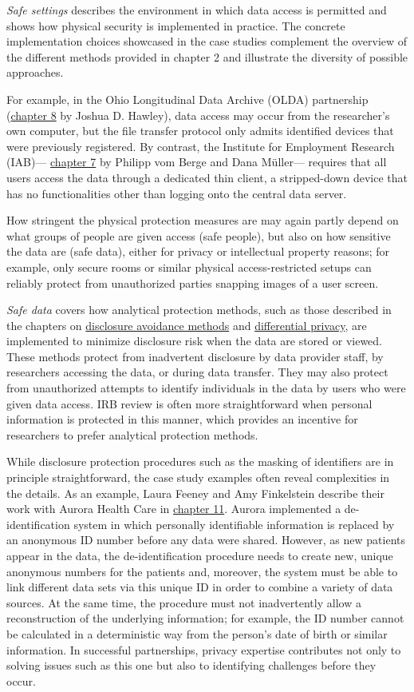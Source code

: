 \documentclass[
]{book}
\begin{document}
\emph{Safe settings} describes the environment in which data access is permitted and shows how physical security is implemented in practice. The concrete implementation choices showcased in the case studies complement the overview of the different methods provided in chapter 2 and illustrate the diversity of possible approaches.

For example, in the Ohio Longitudinal Data Archive (OLDA) partnership (\protect\hyperlink{olda}{chapter 8} by Joshua D. Hawley), data access may occur from the researcher's own computer, but the file transfer protocol only admits identified devices that were previously registered. By contrast, the Institute for Employment Research (IAB)--- \protect\hyperlink{iab}{chapter 7} by Philipp vom Berge and Dana Müller--- requires that all users access the data through a dedicated thin client, a stripped-down device that has no functionalities other than logging onto the central data server.

How stringent the physical protection measures are may again partly depend on what groups of people are given access (safe people), but also on how sensitive the data are (safe data), either for privacy or intellectual property reasons; for example, only secure rooms or similar physical access-restricted setups can reliably protect from unauthorized parties snapping images of a user screen.

\emph{Safe data} covers how analytical protection methods, such as those described in the chapters on \protect\hyperlink{discavoid}{disclosure avoidance methods} and \protect\hyperlink{diffpriv}{differential privacy}, are implemented to minimize disclosure risk when the data are stored or viewed. These methods protect from inadvertent disclosure by data provider staff, by researchers accessing the data, or during data transfer. They may also protect from unauthorized attempts to identify individuals in the data by users who were given data access. IRB review is often more straightforward when personal information is protected in this manner, which provides an incentive for researchers to prefer analytical protection methods.

While disclosure protection procedures such as the masking of identifiers are in principle straightforward, the case study examples often reveal complexities in the details. As an example, Laura Feeney and Amy Finkelstein describe their work with Aurora Health Care in \protect\hyperlink{ahc}{chapter 11}. Aurora implemented a de-identification system in which personally identifiable information is replaced by an anonymous ID number before any data were shared. However, as new patients appear in the data, the de-identification procedure needs to create new, unique anonymous numbers for the patients and, moreover, the system must be able to link different data sets via this unique ID in order to combine a variety of data sources. At the same time, the procedure must not inadvertently allow a reconstruction of the underlying information; for example, the ID number cannot be calculated in a deterministic way from the person's date of birth or similar information. In successful partnerships, privacy expertise contributes not only to solving issues such as this one but also to identifying challenges before they occur.
\end{document}
